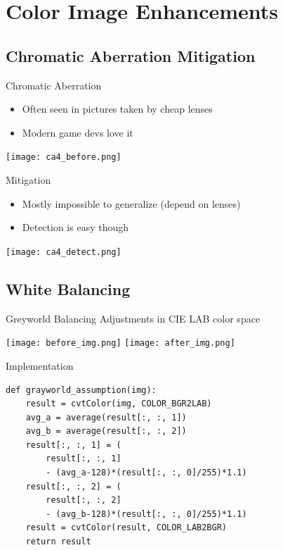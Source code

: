 \documentclass[pdf]{beamer}
\begin{document}
\section{Color Image Enhancements}
\frame{\tableofcontents[currentsection]}
\subsection{Chromatic Aberration Mitigation}
\begin{frame}{Chromatic Aberration}
  \begin{itemize}
    \item Often seen in pictures taken by cheap lenses
    \item Modern game devs love it
  \end{itemize}
  \begin{center}
    \texttt{[image: ca4\_before.png]}
  \end{center}
\end{frame}

\begin{frame}{Mitigation}
  \begin{itemize}
    \item Mostly impossible to generalize (depend on lenses)
    \item Detection is easy though
  \end{itemize}
  \begin{center}
    \texttt{[image: ca4\_detect.png]}
  \end{center}
\end{frame}

\subsection{White Balancing}
\begin{frame}{Greyworld Balancing}\LARGE
  Adjustments in CIE LAB color space
  \begin{center}
    \texttt{[image: before\_img.png]}
    \texttt{[image: after\_img.png]}
  \end{center}
\end{frame}

\begin{frame}[fragile]{Implementation}
\begin{verbatim}
def grayworld_assumption(img):
    result = cvtColor(img, COLOR_BGR2LAB)
    avg_a = average(result[:, :, 1])
    avg_b = average(result[:, :, 2])
    result[:, :, 1] = (
        result[:, :, 1]
        - (avg_a-128)*(result[:, :, 0]/255)*1.1)
    result[:, :, 2] = (
        result[:, :, 2]
        - (avg_b-128)*(result[:, :, 0]/255)*1.1)
    result = cvtColor(result, COLOR_LAB2BGR)
    return result
\end{verbatim}
\end{frame}
\end{document}
